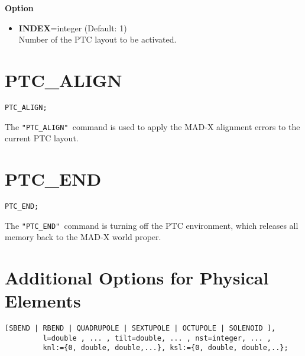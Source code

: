 {\bf Option} \\
\begin{itemize}
   \item {\bf INDEX}=integer (Default: 1) \\
     Number of the PTC layout to be activated.
\end{itemize}

\section{PTC\_ALIGN}

\begin{verbatim}
PTC_ALIGN;
\end{verbatim}

The \texttt{"PTC\_ALIGN" }command is used to apply the MAD-X alignment
errors to the current PTC layout.  

\section{PTC\_END}

\begin{verbatim}
PTC_END;
\end{verbatim}

The \texttt{"PTC\_END" }command  is turning off the PTC environment,
which releases all memory back to the MAD-X world proper.


\section{Additional Options for Physical Elements}

\begin{verbatim}
[SBEND | RBEND | QUADRUPOLE | SEXTUPOLE | OCTUPOLE | SOLENOID ],
         l=double , ... , tilt=double, ... , nst=integer, ... ,
         knl:={0, double, double,...}, ksl:={0, double, double,..}; 
\end{verbatim}


